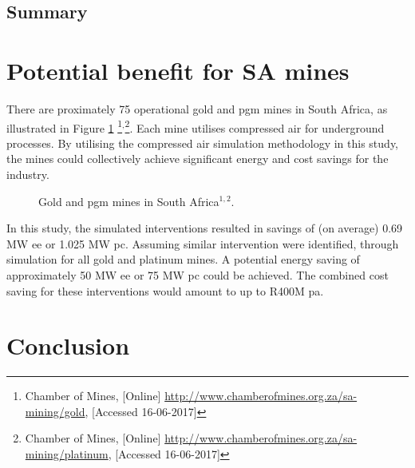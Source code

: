 	\subsection{Summary}
\clearpage
\section{Potential benefit for SA mines}
There are proximately 75 operational gold and \gls{pgm} mines in South Africa, as illustrated in Figure \ref{fig: Mine map} \footnote{ Chamber of Mines, [Online] \url{http://www.chamberofmines.org.za/sa-mining/gold}, [Accessed 16-06-2017]}$^,$\footnote{ Chamber of Mines, [Online] \url{http://www.chamberofmines.org.za/sa-mining/platinum}, [Accessed 16-06-2017]}. Each mine utilises compressed air for underground processes. By utilising the compressed air simulation methodology in this study, the mines could collectively achieve significant energy and cost savings for the industry. 
\par 

	\begin{figure}[h]
		\centering
		\caption{Gold and \gls{pgm} mines in South Africa$^{1,2}$.}
		\label{fig: Mine map}
	\end{figure}
In this study, the simulated interventions resulted in savings of (on average) 0.69 MW \gls{ee} or 1.025 MW \gls{pc}. Assuming similar intervention were identified, through simulation for all gold and platinum mines. A potential energy saving of approximately 50 MW \gls{ee} or  75 MW \gls{pc} could be achieved. The combined cost saving for these interventions would amount to up to R400M \gls{pa}.
\clearpage
\section{Conclusion}